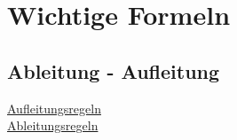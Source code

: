 \section{Wichtige Formeln}
\subsection{Ableitung - Aufleitung}
\hyperref[sec:aufleitungs_regeln]{Aufleitungsregeln} \\
\hyperref[sec:ableitungs_regeln]{Ableitungsregeln}
